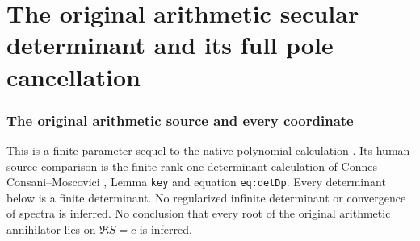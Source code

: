 \endgroup

\clearpage\begingroup
\part*{The original arithmetic secular determinant and its full pole cancellation}
\newcommand{\sfsecC}{\mathbb C}\newcommand{\sfsecR}{\mathbb R}
\newcommand{\sfsecPP}{\mathcal P}\newcommand{\sfsecId}{\operatorname{Id}}
\newcommand{\sfsectr}{\operatorname{tr}}\newcommand{\sfsecim}{\operatorname{im}}
\newcommand{\sfsecord}{\operatorname{ord}}
\newtheorem{sfsectheorem}{Theorem}[section]
\newtheorem{sfsecproposition}[sfsectheorem]{Proposition}
\newtheorem{sfseclemma}[sfsectheorem]{Lemma}


\section{The original arithmetic source and every coordinate}

This is a finite-parameter sequel to the native polynomial calculation
\cite{sfsec:Native}. Its human-source comparison is the finite rank-one
determinant calculation of Connes--Consani--Moscovici \cite{sfsec:CCM},
Lemma \texttt{key} and equation \texttt{eq:detDp}.
Every determinant below is a finite determinant. No regularized
infinite determinant or convergence of spectra is inferred.
No conclusion that every root of the original arithmetic
annihilator lies on $\Re S=c$ is inferred.

